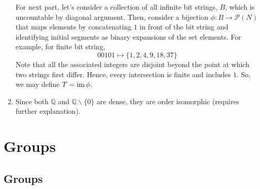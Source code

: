 \documentclass[10pt, a4paper, twoside]{report}
\begin{document}
\begin{enumerate}[{1.}]
    For next part, let's consider a collection of all infinite bit strings, \(B\), which is uncountable by diagonal argument. Then, consider a bijection \(\phi:B\to\mathcal{P}(N)\) that maps elements by concatenating \(1\) in front of the bit string and identifying initial segments as binary expansions of the set elements. For example, for finite bit string, 
    \[00101\mapsto\{1,2,4,9,18,37\}\]
    Note that all the associated integers are disjoint beyond the point at which two strings first differ. Hence, every intersection is finite and includes \(1\). So, we may define \(T=\operatorname{im}\phi\).
    \item Since both \(\mathbb{Q}\) and \(\mathbb{Q}\backslash\{0\}\) are dense, they are order isomorphic (requires further explanation).
\end{enumerate}
\chapter{Groups}
\section{Groups}
\end{document}
